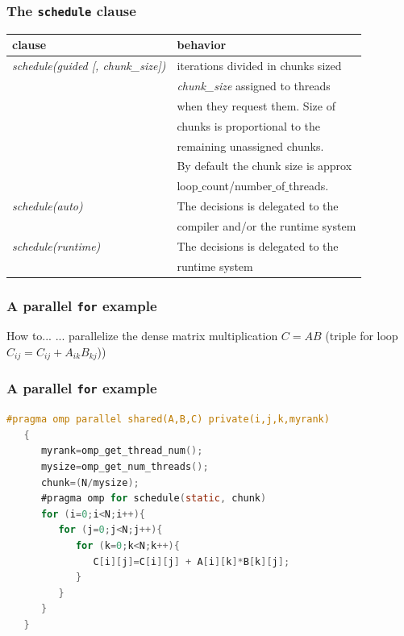 \begin{frame}[containsverbatim]
\frametitle{The \texttt{schedule} clause}

\begin{center}
\begin{tabular}{|l|l|}
\hline
  \textbf{clause} & \textbf{behavior}  \\
\hline
\hline
\textit{schedule(guided [, chunk\_size])}  &
iterations divided in chunks sized \\
& \textit{chunk\_size} assigned to threads \\
& when they request them. Size of  \\
& chunks is proportional to the  \\
& remaining unassigned chunks. \\
& By default the chunk size is approx \\
& loop$\_$count/number$\_$of$\_$threads. \\



\hline
\textit{schedule(auto)}  &
The decisions is delegated to the \\
 & compiler and/or the runtime system \\

\hline
\textit{schedule(runtime)}  &
The decisions is delegated to the \\
 & runtime system \\


\hline
\end{tabular}
\end{center}

\end{frame}


\begin{frame}[containsverbatim]
\frametitle{A parallel \texttt{for} example}


\begin{block}{How to...}
... parallelize the dense matrix multiplication $C = A B$ (triple for loop $C_{ij} = C_{ij} + A_{ik} B_{kj}$))
\end{block}

\end{frame}


\begin{frame}[containsverbatim]
\frametitle{A parallel \texttt{for} example}
\begin{lstlisting}[language=C,frame=lines]
   #pragma omp parallel shared(A,B,C) private(i,j,k,myrank)
   {
      myrank=omp_get_thread_num();
      mysize=omp_get_num_threads();
      chunk=(N/mysize);
      #pragma omp for schedule(static, chunk)
      for (i=0;i<N;i++){
         for (j=0;j<N;j++){
            for (k=0;k<N;k++){
               C[i][j]=C[i][j] + A[i][k]*B[k][j];
            }
         }
      }
   }
\end{lstlisting}
\end{frame}

